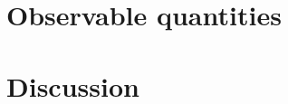 \section{Observable quantities}
\label{sec:observable-perts}

% 
% 
% 
% 
\section{Discussion}
\label{sec:disc-perts}
